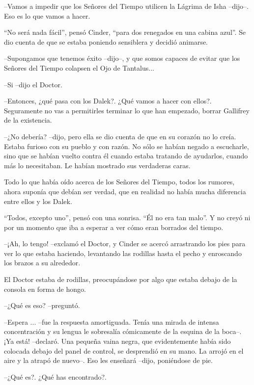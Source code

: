 --Vamos a impedir que los Señores del Tiempo utilicen la Lágrima de Isha --dijo--. Eso es lo que vamos a hacer.



``No será nada fácil'', pensó Cinder, ``para dos renegados en una cabina azul''. Se dio cuenta de que se estaba poniendo sensiblera y decidió animarse. 



--Supongamos que tenemos éxito --dijo--, y que somos capaces de evitar que los Señores del Tiempo colapsen el Ojo de Tantalus...

--Si --dijo el Doctor.

--Entonces, ¿qué pasa con los Dalek?. ¿Qué vamos a hacer con ellos?. Seguramente no vas a permitirles terminar lo que han empezado, borrar Gallifrey de la existencia.

--¿No debería? --dijo, pero ella se dio cuenta de que en su corazón no lo creía. Estaba furioso con su pueblo y con razón. No sólo se habían negado a escucharle, sino que se habían vuelto contra él cuando estaba tratando de ayudarlos, cuando más lo necesitaban. Le habían mostrado sus verdaderas caras.

Todo lo que había oído acerca de los Señores del Tiempo, todos los rumores, ahora suponía que debían ser verdad, que en realidad no había mucha diferencia entre ellos y los Dalek.

``Todos, excepto uno'', pensó con una sonrisa. ``Él no era tan malo''. Y no creyó ni por un momento que iba a esperar a ver cómo eran borrados del tiempo.



--¡Ah, lo tengo! --exclamó el Doctor, y Cinder se acercó arrastrando los pies para ver lo que estaba haciendo, levantando las rodillas hasta el pecho y enroscando los brazos a su alrededor.

El Doctor estaba de rodillas, preocupándose por algo que estaba debajo de la consola en forma de hongo. 



--¿Qué es eso? --preguntó.

--Espera ... --fue la respuesta amortiguada. Tenía una mirada de intensa concentración y su lengua le sobresalía cómicamente de la esquina de la boca--. ¡Ya está! --declaró. Una pequeña vaina negra, que evidentemente había sido colocada debajo del panel de control, se desprendió en su mano. La arrojó en el aire y la atrapó de nuevo--. Eso les enseñará --dijo, poniéndose de pie.

--¿Qué es?. ¿Qué has encontrado?.



